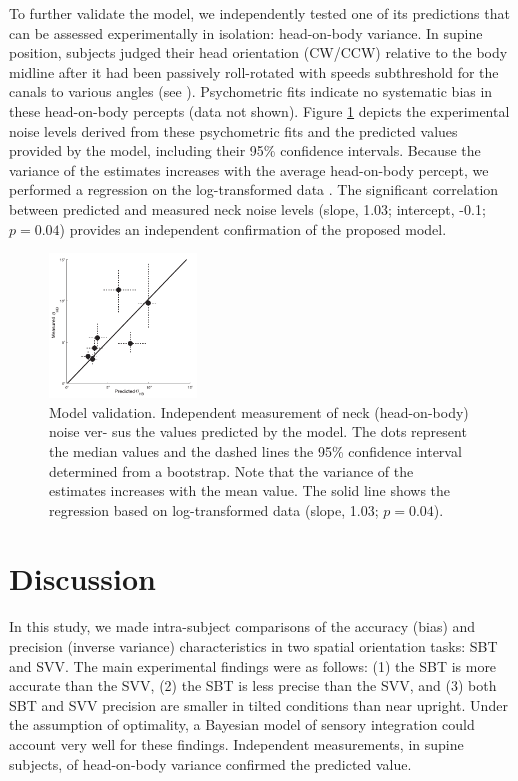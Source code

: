 To further validate the model, we independently tested one of its predictions that can be assessed experimentally in isolation: head-on-body variance. In supine position, subjects judged their head orientation (CW/CCW) relative to the body midline after it had been passively roll-rotated with speeds subthreshold for the canals to various angles (see ). Psychometric fits indicate no systematic bias in these head-on-body percepts (data not shown). Figure \ref{p1:fig6} depicts the experimental noise levels derived from these psychometric fits and the predicted values provided by the model, including their 95\% confidence intervals. Because the variance of the estimates increases with the average head-on-body percept, we performed a regression on the log-transformed data \cite{hopkins2000}. The significant correlation between predicted and measured neck noise levels (slope, 1.03; intercept, -0.1; $p = 0.04$) provides an independent confirmation of the proposed model.

\begin{figure}
    \includegraphics[width=0.35\textwidth]{src/paper1/figure6.pdf}

    \caption{Model validation. Independent measurement of neck (head-on-body) noise ver- sus the values predicted by the model. The dots represent the median values and the dashed lines the 95\% confidence interval determined from a bootstrap. Note that the variance of the estimates increases with the mean value. The solid line shows the regression based on log-transformed data (slope, 1.03; $p = 0.04$).}

    \label{p1:fig6}
\end{figure}



\section{Discussion}

In this study, we made intra-subject comparisons of the accuracy (bias) and precision (inverse variance) characteristics in two spatial orientation tasks: SBT and SVV. The main experimental findings were as follows: (1) the SBT is more accurate than the SVV, (2) the SBT is less precise than the SVV, and (3) both SBT and SVV precision are smaller in tilted conditions than near upright. Under the assumption of optimality, a Bayesian model of sensory integration could account very well for these findings. Independent measurements, in supine subjects, of head-on-body variance confirmed the predicted value.


